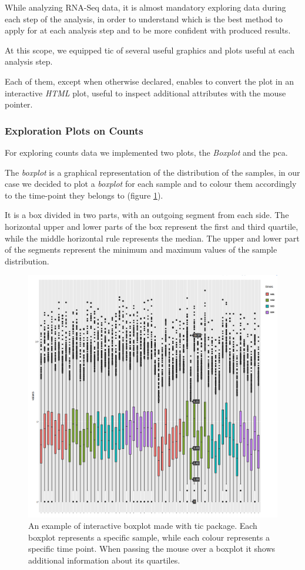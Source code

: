 While analyzing RNA-Seq data, it is almost mandatory exploring data during each step of the analysis, in order to understand which is the best method to apply for at each analysis step and to be more confident with produced results. 

At this scope, we equipped \gls{tic} of several useful graphics and plots useful  at each analysis step.

Each of them, except when otherwise declared, enables to convert the plot in an interactive \textit{HTML} plot, useful to inspect additional attributes with the mouse pointer.

\subsubsection{Exploration Plots on Counts}
For exploring counts data we implemented two plots, the \textit{Boxplot} and the \gls{pca}.

The \textit{boxplot} is a graphical representation of the distribution of the samples, in our case we decided to plot a \textit{boxplot} for each sample and to colour them accordingly to the time-point they belongs to (figure \ref{fig:ticorserboxplot}).

It is a box divided in two parts, with an outgoing segment from each side. 
The horizontal upper and lower parts of the box represent the first and third quartile, while the middle horizontal rule represents the median.
The upper and lower part of the segments represent the minimum and maximum values of the sample distribution.

\begin{figure}[H]
\includegraphics[width=\textwidth,height=\textheight,keepaspectratio]{img/ticorser/boxplot_example.png}
\caption[ticorser boxplot]{An example of interactive boxplot made with \gls{tic} package. Each boxplot represents a specific sample, while each colour represents a specific time point. When passing the mouse over a boxplot it shows additional information about its quartiles.}
\label{fig:ticorserboxplot}
\centering
\end{figure}

